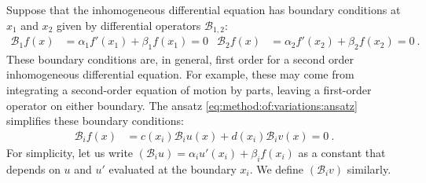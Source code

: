 Suppose that the inhomogeneous differential equation has boundary conditions at $x_1$ and $x_2$ given by differential operators $\mathcal B_{1,2}$:
\begin{align}
	\mathcal B_1 f(x) &= \alpha_1 f'(x_1) + \beta_1 f(x_1) = 0
	&
	\mathcal B_2 f(x) &= \alpha_2 f'(x_2) + \beta_2 f(x_2) = 0 \ .
\end{align}
These boundary conditions are, in general, first order for a second order inhomogeneous differential equation. For example, these may come from integrating a second-order equation of motion by parts, leaving a first-order operator on either boundary.
%
The ansatz \eqref{eq:method:of:variations:ansatz} simplifies these boundary conditions:
\begin{align}
	\mathcal B_i f(x) &= 
	c(x_i) \mathcal B_i u (x) 
	+
	d(x_i) \mathcal B_i v (x) 
	= 0 
	\ .
	\label{eq:method:of:variations:BC}
\end{align}
For simplicity, let us write $(\mathcal B_i u) = \alpha_i u'(x_i) + \beta_i f(x_i)$ as a constant that depends on $u$ and $u'$ evaluated at the boundary $x_i$. We define $(\mathcal B_i v)$ similarly. 

